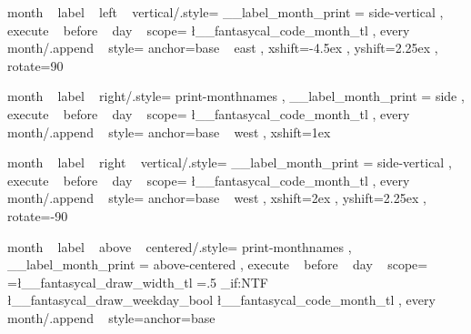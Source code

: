 \tikzset
  {
    month ~ label ~ left ~ vertical/.style=
      {
        __label_month_print = { side-vertical } ,
        execute ~ before ~ day ~ scope=
          {
             { \l__fantasycal_code_month_tl } 
          } ,
        every ~ month/.append ~ style=
          { anchor=base ~ east , xshift=-4.5ex , yshift=2.25ex , rotate=90 }
      }
  }

\tikzset
  {
    month ~ label ~ right/.style=
      {
        print-monthnames ,
        __label_month_print = { side } ,
        execute ~ before ~ day ~ scope=
          {
              {
                {
                  \l__fantasycal_code_month_tl
                }
              }
          }
        ,
        every ~ month/.append ~ style={ anchor=base ~ west , xshift=1ex }
    }
  }

\tikzset
  {
    month ~ label ~ right ~ vertical/.style=
      {
        __label_month_print = { side-vertical } ,
        execute ~ before ~ day ~ scope=
          {
              {
                {
                  \l__fantasycal_code_month_tl%
                }
              }
          }
        ,
        every ~ month/.append ~ style=
          { anchor=base ~ west , xshift=2ex , yshift=2.25ex , rotate=-90 }
    }
  }




\tikzset
  {
    month ~ label ~ above ~ centered/.style=
      {
        print-monthnames ,
        __label_month_print = { above-centered } ,
        execute ~ before ~ day ~ scope=
          {
              {
                {
                  \pgf@xb=\l__fantasycal_draw_width_tl\pgf@xa%
                  \pgf@xb=.5\pgf@xb%
                  \pgftransformxshift{\pgf@xb}
                  \bool_if:NTF \l__fantasycal_draw_weekday_bool
                    {  }
                    {  }
                  \l__fantasycal_code_month_tl
                }
              } 
          }
        ,
        every ~ month/.append ~ style={anchor=base}
      }
  }

